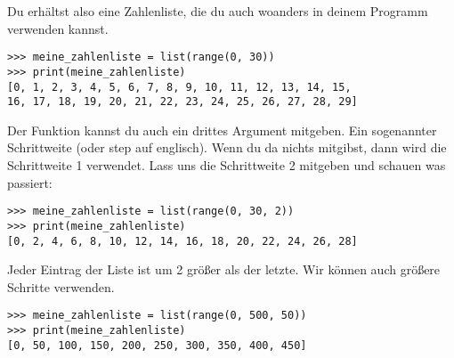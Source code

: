 \noindent
Du erhältst also eine Zahlenliste, die du auch woanders in deinem Programm verwenden kannst.

\begin{Verbatim}[frame=single]
>>> meine_zahlenliste = list(range(0, 30))
>>> print(meine_zahlenliste)
[0, 1, 2, 3, 4, 5, 6, 7, 8, 9, 10, 11, 12, 13, 14, 15,
16, 17, 18, 19, 20, 21, 22, 23, 24, 25, 26, 27, 28, 29]
\end{Verbatim}

\noindent
Der  Funktion kannst du auch ein drittes Argument mitgeben. Ein sogenannter Schrittweite (oder step auf englisch). Wenn du da nichts mitgibst, dann wird die Schrittweite 1 verwendet. Lass uns die Schrittweite 2 mitgeben und schauen was passiert:

\begin{Verbatim}[frame=single]
>>> meine_zahlenliste = list(range(0, 30, 2))
>>> print(meine_zahlenliste)
[0, 2, 4, 6, 8, 10, 12, 14, 16, 18, 20, 22, 24, 26, 28]
\end{Verbatim}

\noindent
Jeder Eintrag der Liste ist um 2 größer als der letzte. Wir können auch größere Schritte verwenden.

\begin{Verbatim}[frame=single]
>>> meine_zahlenliste = list(range(0, 500, 50))
>>> print(meine_zahlenliste)
[0, 50, 100, 150, 200, 250, 300, 350, 400, 450]
\end{Verbatim}

